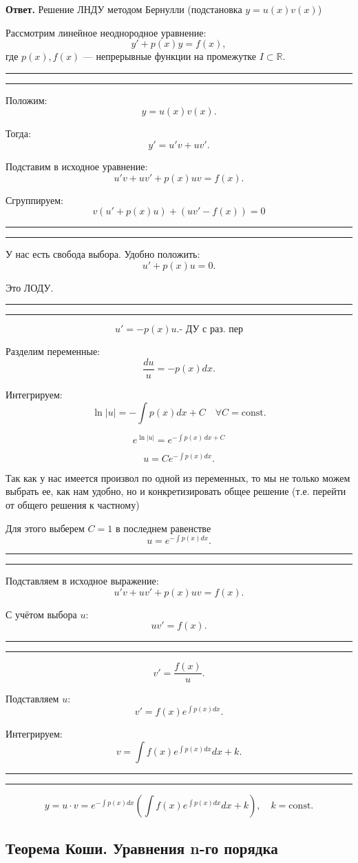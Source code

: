 \documentclass[a4paper,11pt]{article}
\newcommand{\examanswer}[1]{
\begin{answerbox}
\textbf{Ответ.} #1
\end{answerbox}
}
\newcommand{\examstep}[1]{
\par\smallskip
\noindent\textcolor{answercolor}{\rule{\linewidth}{0.4pt}}
\par\vspace{-2pt}
\noindent{\textbf{\textcolor{answercolor}{#1}}}
\par\vspace{-4pt}
\noindent\textcolor{answercolor}{\rule{\linewidth}{0.4pt}}
\par\smallskip
}
\begin{document}
\examanswer{
Решение ЛНДУ методом Бернулли (подстановка $y=u(x)v(x)$)

Рассмотрим линейное неоднородное уравнение:
\[
y'+p(x)y=f(x),
\]
где $p(x),f(x)$ — непрерывные функции на промежутке $I\subset \mathbb{R}$.

\examstep{Шаг 1. Подстановка}

Положим:
\[
y=u(x)v(x).
\]

Тогда:
\[
y'=u'v+uv'.
\]

Подставим в исходное уравнение:
\[
u'v+uv'+p(x)uv=f(x).
\]

Сгруппируем:
\[ 
v(u'+p(x)u) + (uv' -f(x)) = 0
\]

\examstep{Шаг 2. Выбор функции $u(x)$}

У нас есть свобода выбора. Удобно положить:
\[
u'+p(x)u=0.
\]

Это ЛОДУ.

\examstep{Шаг 3. Решение для $u(x)$}

\[
u'=-p(x)u. \text{- ДУ с раз. пер}
\]

Разделим переменные:
\[
\frac{du}{u}=-p(x)dx.
\]

Интегрируем:
\[
\ln|u|=-\int p(x)dx+C \quad \forall C = \mathrm{const}.
\]

\[
e^{\ln|u|} = e^{-\int p(x)\,dx + C}
\]

\[
u=Ce^{-\int p(x)dx}.
\]

Так как у нас имеется произвол по одной из переменных, то мы не только можем
выбрать ее, как нам удобно, но и конкретизировать общее решение (т.е. перейти от
общего решения к частному)

Для этого выберем $C = 1$ в последнем равенстве
\[
u=e^{-\int p(x)dx}.
\]

\examstep{Шаг 4. Подстановка в уравнение}

Подставляем в исходное выражение:
\[
u'v+uv'+p(x)uv=f(x).
\]

С учётом выбора $u$:
\[
uv'=f(x).
\]

\examstep{Шаг 5. Нахождение $v(x)$}

\[
v'=\frac{f(x)}{u}.
\]

Подставляем $u$:
\[
v'=f(x)e^{\int p(x)dx}.
\]

Интегрируем:
\[
v=\int f(x)e^{\int p(x)dx}dx+k.
\]

\examstep{Итоговое решение}

\[
y=u\cdot v=e^{-\int p(x)dx}\left(\int f(x)e^{\int p(x)dx}dx+k\right),\quad k=\mathrm{const}.
\]
} 

\subsection{Теорема Коши. Уравнения n-го порядка}
\end{document}
